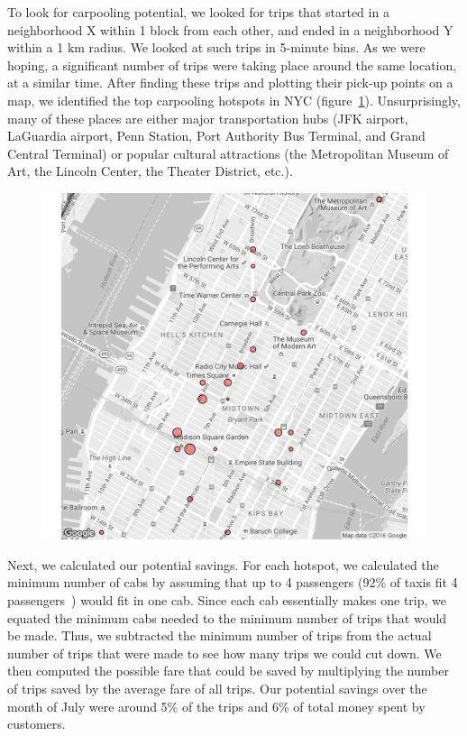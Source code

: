 \documentclass[twocolumn]{article}
\begin{document}
To look for carpooling potential, we looked for trips that started in a neighborhood X within 1 block from each other, and ended in a neighborhood Y within a 1 km radius. We looked at such trips in 5-minute bins. As we were hoping, a significant number of trips were taking place around the same location, at a similar time. After finding these trips and plotting their pick-up points on a map, we identified the top carpooling hotspots in NYC (figure~\ref{fig:hotspots}). Unsurprisingly, many of these places are either major transportation hubs (JFK airport, LaGuardia airport, Penn Station, Port Authority Bus Terminal, and Grand Central Terminal) or popular cultural attractions (the Metropolitan Museum of Art, the Lincoln Center, the Theater District, etc.). 
\begin{figure}[h]
  \centering
  \includegraphics[width=.9\linewidth]{top_25_hotspots}
  \label{fig:hotspots}
\end{figure}

Next, we calculated our potential savings. For each hotspot, we calculated the minimum number of cabs by assuming that up to 4 passengers (92\% of taxis fit 4 passengers~\cite{TLC:2007}) would fit in one cab. Since each cab essentially makes one trip, we equated the minimum cabs needed to the minimum number of trips that would be made. Thus, we subtracted the minimum number of trips from the actual number of trips that were made to see how many trips we could cut down. We then computed the possible fare that could be saved by multiplying the number of trips saved by the average fare of all trips. Our potential savings over the month of July were around 5\% of the trips and 6\% of total money spent by customers.
\end{document}
